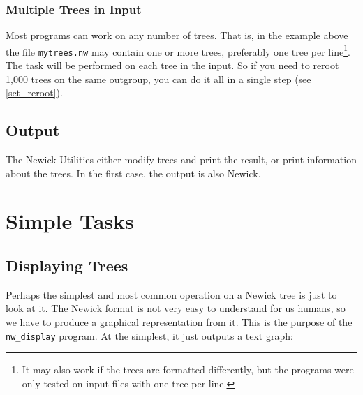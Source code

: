 \documentclass[a4paper,10pt]{report}
\newcommand{\nutils}{Newick Utilities}
\newcommand{\nw}{Newick}
\newcommand{\display}{\texttt{nw\_display}}
\begin{document}
\subsection{Multiple Trees in Input}

Most programs can work on any number of trees. That is, in the example above the file \texttt{mytrees.nw} may contain one or more trees, preferably one tree per line\footnote{It may also work if the trees are formatted differently, but the programs were only tested on input files with one tree per line.}. The task will be performed on each tree in the input. So if you need to reroot 1,000 trees on the same outgroup, you can do it all in a single step (see \ref{sct_reroot}).

\section{Output}
\label{sect_output}

The \nutils{} either modify trees and print the result, or print information about the trees. In the first case, the output is also Newick.

\chapter{Simple Tasks}
\label{chap_simple}

\section{Displaying Trees}
\label{sct_display}

Perhaps the simplest and most common operation on a \nw{} tree is just to look at it. The \nw{} format is not very easy to understand for us humans, so we have to produce a graphical representation from it. This is the purpose of the \display{} program. At the simplest, it just outputs a text graph:
\end{document}
